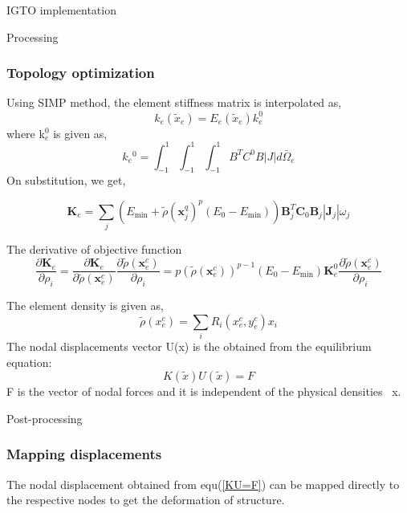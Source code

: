 \documentclass[a4paper,12pt,times]{article}
\begin{document}
\begin{section}{IGTO implementation}
\begin{subsection}{Processing}
\subsubsection{Topology optimization}
Using SIMP method, the element stiffness matrix is interpolated as,
\begin{equation}
k_{e}\left(\tilde{x}_{e}\right)=E_{e}\left(\tilde{x}_{e}\right) k_{e}^{0}
\end{equation}
where k$_{e}^{0}$ is given as,
\begin{equation}
k{_e}^{0}=\int_{-1}^{1} \int_{-1}^{1} \int_{-1}^{1} B^{T} C^{0} B|J| d \bar{\Omega}_{e}
\end{equation}
On substitution, we get,
 
\begin{equation}
\boldsymbol{K}_{e}=\sum_{j}\left(E_{\min }+\tilde{\rho}\left(\boldsymbol{x}_{j}^{q}\right)^{p}\left(E_{0}-E_{\min }\right)\right) \boldsymbol{B}_{j}^{T} \boldsymbol{C}_{0} \boldsymbol{B}_{j}\left|\boldsymbol{J}_{j}\right| \omega_{j}
\end{equation}

The derivative of objective function
\begin{equation}
\frac{\partial \boldsymbol{K}_{e}}{\partial \rho_{i}}=\frac{\partial \boldsymbol{K}_{e}}{\partial \tilde{\rho}\left(\boldsymbol{x}_{e}^{c}\right)} \frac{\partial \tilde{\rho}\left(\boldsymbol{x}_{e}^{c}\right)}{\partial \rho_{i}}=p\left(\tilde{\rho}\left(\boldsymbol{x}_{e}^{c}\right)\right)^{p-1}\left(E_{0}-E_{\min }\right) \boldsymbol{K}_{e}^{0} \frac{\partial \tilde{\rho}\left(\boldsymbol{x}_{e}^{c}\right)}{\partial \rho_{i}}
\end{equation}

The element density is given as,
\begin{equation}
\tilde{\rho}\left(x_{e}^{c}\right)=\sum_{i } R_{i}\left(x_{e}^{c}, y_{e}^{c}\right) x_{i}
\end{equation}
The nodal displacements vector U(x) is the
obtained from the equilibrium equation:
\begin{equation}\label{KU=F}
K(\tilde{x}) U(\tilde{x})=F
\end{equation}
F is the vector of nodal forces and it is independent of the physical densities ~x.

\end{subsection}
\begin{subsection}{Post-processing}
\subsubsection{Mapping displacements}
The nodal displacement obtained from equ(\ref{KU=F}) can be mapped directly to the respective nodes to get the deformation of structure.


\end{subsection}
\end{section}
\end{document}

